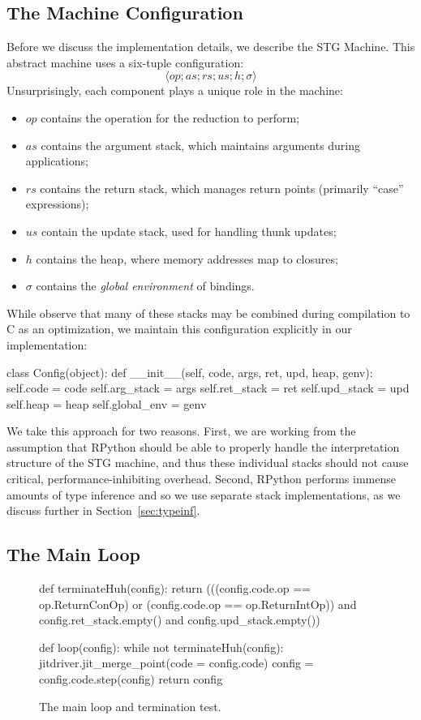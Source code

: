 \documentclass[preprint]{sigplanconf}
\begin{document}
\subsection{The Machine Configuration}

Before we discuss the implementation details, we describe the
STG Machine. This abstract machine uses a six-tuple configuration:
\[\langle op; as; rs; us; h; \sigma\rangle\]
Unsurprisingly, each component plays a unique role in the machine:
\begin{itemize}
  \item $op$ contains the operation for the reduction to perform;
  \item $as$ contains the argument stack, which maintains arguments
        during applications;
  \item $rs$ contains the return stack, which manages return points
        (primarily ``case'' expressions);
  \item $us$ contain the update stack, used for handling thunk updates;
  \item $h$ contains the heap, where memory addresses map to closures;
  \item $\sigma$ contains the \emph{global environment} of bindings.
\end{itemize}
While \citet{spj:stgmachine} observe that many of these stacks may
be combined during compilation to C as an optimization, we maintain
this configuration explicitly in our implementation:
\begin{code}
class Config(object):
  def __init__(self, code, args, ret,  
                     upd, heap, genv):
    self.code       = code
    self.arg_stack  = args
    self.ret_stack  = ret
    self.upd_stack  = upd
    self.heap       = heap
    self.global_env = genv
\end{code}
We take this approach for two reasons. First, we are working from the
assumption that RPython should be able to properly handle the interpretation
structure of the STG machine, and thus these individual stacks should not
cause critical, performance-inhibiting overhead.
Second, RPython performs immense amounts of type inference and so we use
separate stack implementations, as we discuss further in
Section~\ref{sec:typeinf}.

\subsection{The Main Loop}

\begin{figure}
\begin{code}
def terminateHuh(config):
  return 
    (((config.code.op == op.ReturnConOp) or 
      (config.code.op == op.ReturnIntOp)) 
     and config.ret_stack.empty()
     and config.upd_stack.empty())

def loop(config):
  while not terminateHuh(config):
    jitdriver.jit_merge_point(code = 
                                config.code)
    config = config.code.step(config)
  return config
\end{code}
\caption{\label{fig:loop}The main loop and termination test.}
\end{figure}
\end{document}
